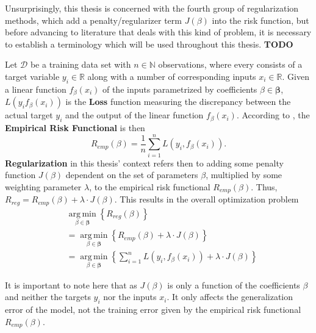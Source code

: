 \documentclass[12pt,a4paper]{article}
\DeclareMathOperator*{\argmin}{arg\,min}
\begin{document}
Unsurprisingly, this thesis is concerned with the fourth group of regularization methods, which add a penalty/regularizer term $J(\beta)$ into the risk function, but before advancing to literature that deals with this kind of problem, it is necessary to establish a terminology which will be used throughout this thesis. \textbf{TODO}

Let $\mathcal{D}$ be a training data set with $n \in \mathbb{N}$ observations, where every  consists of a target variable $y_i \in \mathbb{R}$ along with a number of corresponding inputs $x_i \in \mathbb{R}$. Given a linear function $f_\beta(x_i)$ of the inputs parametrized by coefficients $\beta \in \boldsymbol{\beta}$, $L(y_i f_\beta(x_i))$ is the \textbf{Loss} function measuring the discrepancy between the actual target $y_i$ and the output of the linear function $f_\beta(x_i)$. According to \textcite{Vapnik1991}, the \textbf{Empirical Risk Functional} is then 
\[
R_{emp}(\beta) = \frac{1}{n} \sum_{i=1}^n L(y_i, f_\beta(x_i)).
\]
\textbf{Regularization} in this thesis' context refers then to adding some penalty function $J(\beta)$ dependent on the set of parameters $\beta$, multiplied by some weighting parameter $\lambda$, to the empirical risk functional $R_{emp}(\beta)$. Thus, $R_{reg} = R_{emp}(\beta) + \lambda\cdot J(\beta)$. This results in the overall optimization problem
\begin{align*}
&\underset{\beta \in \boldsymbol{\beta}}{\argmin}\left\{R_{reg}(\beta)\right\}\\
&=\underset{\beta \in \boldsymbol{\beta}}{\argmin}\left\{R_{emp}(\beta) + \lambda\cdot J(\beta)\right\}\\
&=\underset{\beta \in \boldsymbol{\beta}}{\argmin}\left\{\sum_{i=1}^n L(y_i, f_\beta(x_i)) + \lambda\cdot J(\beta)\right\}
\end{align*}

It is important to note here that as $J(\beta)$ is only a function of the coefficients $\beta$ and neither the targets $y_i$ nor the inputs $x_i$. It only affects the generalization error of the model, not the training error given by the empirical risk functional $R_{emp}(\beta)$.
\end{document}
